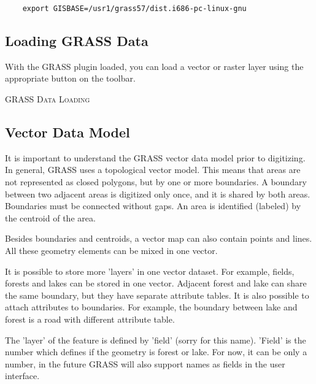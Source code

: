 \begin{verbatim}
    export GISBASE=/usr1/grass57/dist.i686-pc-linux-gnu 
\end{verbatim}

\subsection{Loading GRASS Data}

With the GRASS plugin loaded, you can load a vector or raster layer using the
appropriate button on the toolbar. 

\begin{Tip}\caption{\textsc{GRASS Data
Loading}}
\end{Tip} 

\subsection{Vector Data Model}\label{label_vectmodel}

It is important to understand the GRASS vector data model prior to
digitizing. In general, GRASS uses a topological
vector model. This means that areas are not represented
as closed polygons, but by one or more boundaries. A boundary between two
adjacent areas is digitized only once, and it is shared by both areas.
Boundaries must be connected without gaps. An area is identified (labeled) by
the centroid of the area.

Besides boundaries and centroids, a vector map can also contain
points and lines. All these geometry elements can be mixed
in one vector.

It is possible to store more 'layers' in one vector dataset. For example,
fields, forests and lakes can be stored in one vector. Adjacent
forest and lake can share the same boundary, but they have separate attribute
tables. It is also possible to attach attributes to boundaries. For example,
the boundary between lake and forest is a road with different attribute table.
 

The 'layer' of the feature is defined by 'field' (sorry for this name).
'Field' is the number which defines if the geometry is forest or lake.
For now, it can be only a number, in the future GRASS will also support  
names as fields in the user interface.

